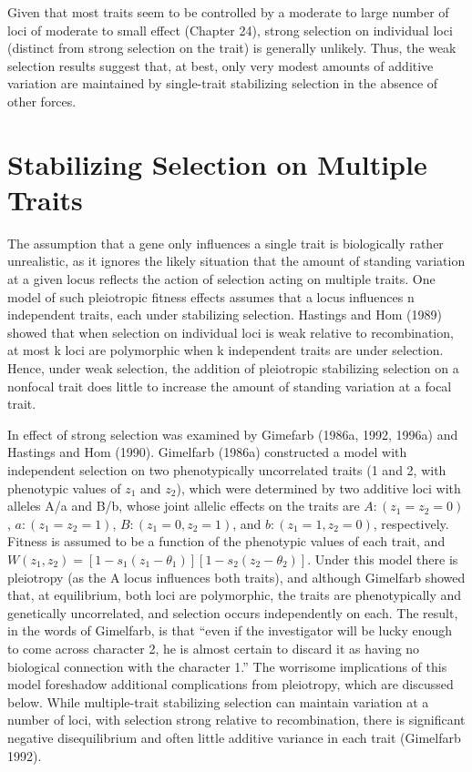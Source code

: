 \documentclass{article}
\begin{document}
Given that most traits seem to be controlled by a moderate to large number of loci of moderate to small effect (Chapter 24), strong selection on individual loci (distinct from strong selection on the trait) is generally unlikely. Thus, the weak selection results suggest that, at best, only very modest amounts of additive variation are maintained by single-trait stabilizing selection in the absence of other forces.

\section{Stabilizing Selection on Multiple Traits}
The assumption that a gene only influences a single trait is biologically rather unrealistic, as it ignores the likely situation that the amount of standing variation at a given locus reflects the action of selection acting on multiple traits. One model of such pleiotropic fitness effects assumes that a locus influences n independent traits, each under stabilizing selection. Hastings and Hom (1989) showed that when selection on individual loci is weak relative to recombination, at most k loci are polymorphic when k independent traits are under selection. Hence, under weak selection, the addition of pleiotropic stabilizing selection on a nonfocal trait does little to increase the amount of standing variation at a focal trait.

In effect of strong selection was examined by Gimefarb (1986a, 1992, 1996a) and Hastings and Hom (1990). Gimelfarb (1986a) constructed a model with independent selection on two phenotypically uncorrelated traits (1 and 2, with phenotypic values of  $ z_1 $ and  $ z_2 $), which were determined by two additive loci with alleles A/a and B/b, whose joint allelic effects on the traits are  $ A: (z_1 = z_2 = 0) $,  $ a: (z_1 = z_2 = 1) $,  $ B: (z_1 = 0, z_2 = 1) $, and  $ b: (z_1 = 1, z_2 = 0) $, respectively. Fitness is assumed to be a function of the phenotypic values of each trait, and  $ W(z_1, z_2) = [1 - s_1(z_1 - \theta_1)][1 - s_2(z_2 - \theta_2)] $. Under this model there is pleiotropy (as the A locus influences both traits), and although Gimelfarb showed that, at equilibrium, both loci are polymorphic, the traits are phenotypically and genetically uncorrelated, and selection occurs independently on each. The result, in the words of Gimelfarb, is that “even if the investigator will be lucky enough to come across character 2, he is almost certain to discard it as having no biological connection with the character 1.” The worrisome implications of this model foreshadow additional complications from pleiotropy, which are discussed below. While multiple-trait stabilizing selection can maintain variation at a number of loci, with selection strong relative to recombination, there is significant negative disequilibrium and often little additive variance in each trait (Gimelfarb 1992).
\end{document}
